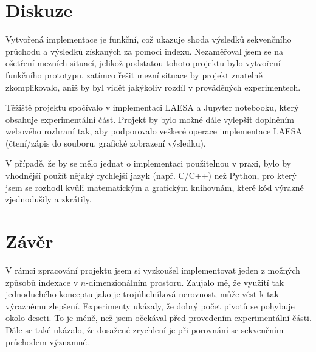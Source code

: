 \documentclass{article}
\begin{document}
\section{Diskuze}

Vytvořená implementace je funkční, což ukazuje shoda výsledků sekvenčního průchodu a výsledků získaných za pomoci indexu. Nezaměřoval jsem se na ošetření mezních situací, jelikož podstatou tohoto projektu bylo vytvoření funkčního prototypu, zatímco řešit mezní situace by projekt znatelně zkomplikovalo, aniž by byl vidět jakýkoliv rozdíl v prováděných experimentech. 

Těžiště projektu spočívalo v implementaci LAESA a Jupyter notebooku, který obsahuje experimentální část. Projekt by bylo možné dále vylepšit doplněním webového rozhraní tak, aby podporovalo veškeré operace implementace LAESA (čtení/zápis do souboru, grafické zobrazení výsledku).

V případě, že by se mělo jednat o implementaci použitelnou v praxi, bylo by vhodnější použít nějaký rychlejší jazyk (např. C/C++) než Python, pro který jsem se rozhodl kvůli matematickým a grafickým knihovnám, které kód výrazně zjednodušily a zkrátily.

\section{Závěr}

V rámci zpracování projektu jsem si vyzkoušel implementovat jeden z možných způsobů indexace v $n$-dimenzionálním prostoru. Zaujalo mě, že využití tak jednoduchého konceptu jako je trojúhelníková nerovnost, může vést k tak výraznému zlepšení. Experimenty ukázaly, že dobrý počet pivotů se pohybuje okolo deseti. To je méně, než jsem očekával před provedením experimentální části. Dále se také ukázalo, že dosažené zrychlení je při porovnání se sekvenčním průchodem významné.
\end{document}

